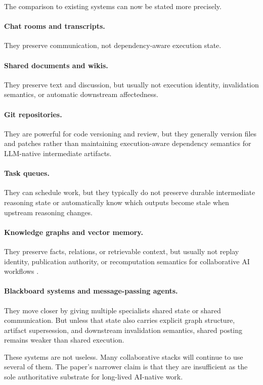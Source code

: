 \documentclass{article}
\begin{document}
The comparison to existing systems can now be stated more precisely.

\paragraph{Chat rooms and transcripts.}
They preserve communication, not dependency-aware execution state.

\paragraph{Shared documents and wikis.}
They preserve text and discussion, but usually not execution identity, invalidation semantics, or automatic downstream affectedness.

\paragraph{Git repositories.}
They are powerful for code versioning and review, but they generally version files and patches rather than maintaining execution-aware dependency semantics for LLM-native intermediate artifacts.

\paragraph{Task queues.}
They can schedule work, but they typically do not preserve durable intermediate reasoning state or automatically know which outputs become stale when upstream reasoning changes.

\paragraph{Knowledge graphs and vector memory.}
They preserve facts, relations, or retrievable context, but usually not replay identity, publication authority, or recomputation semantics for collaborative AI workflows \cite{hogan2021knowledgegraphs}.

\paragraph{Blackboard systems and message-passing agents.}
They move closer by giving multiple specialists shared state or shared communication. But unless that state also carries explicit graph structure, artifact supersession, and downstream invalidation semantics, shared posting remains weaker than shared execution.

These systems are not useless. Many collaborative stacks will continue to use several of them. The paper's narrower claim is that they are insufficient as the sole authoritative substrate for long-lived AI-native work.
\end{document}
